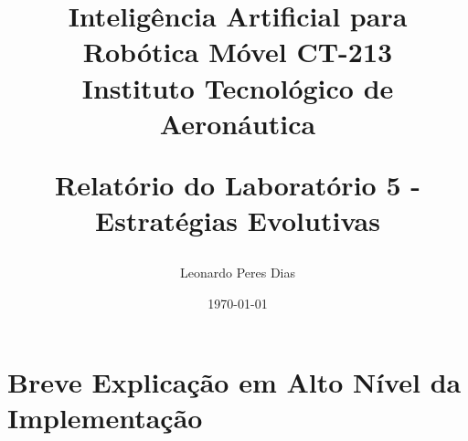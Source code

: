 \documentclass[a4paper,12pt]{article}
\title{
    \textbf{Inteligência Artificial para Robótica Móvel CT-213}\\
    \Large Instituto Tecnológico de Aeronáutica 

    \textbf{Relatório do Laboratório 5 - Estratégias Evolutivas}\\
}
\author{
    Leonardo Peres Dias 
}
\date{\today}
\begin{document}
\BgThispage
\maketitle
\thispagestyle{empty} %


\newpage
\NoBgThispage %

\tableofcontents

\newpage
\NoBgThispage %

\section{Breve Explicação em Alto Nível da Implementação}
\end{document}
